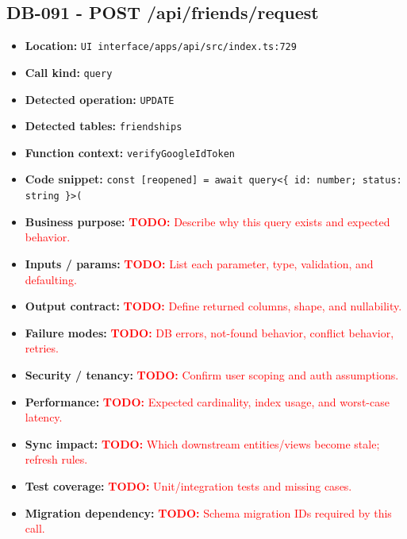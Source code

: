 \documentclass[11pt]{article}
\newcommand{\todoitem}[1]{\textcolor{red}{\textbf{TODO:} #1}}
\begin{document}
\subsection{DB-091 - POST /api/friends/request}
\begin{itemize}[leftmargin=1.5em]
\item \textbf{Location:} \texttt{UI interface/apps/api/src/index.ts:729}
\item \textbf{Call kind:} \texttt{query}
\item \textbf{Detected operation:} \texttt{UPDATE}
\item \textbf{Detected tables:} \texttt{friendships}
\item \textbf{Function context:} \texttt{verifyGoogleIdToken}
\item \textbf{Code snippet:} \texttt{const [reopened] = await query<\{ id: number; status: string \}>(}
\item \textbf{Business purpose:} \todoitem{Describe why this query exists and expected behavior.}
\item \textbf{Inputs / params:} \todoitem{List each parameter, type, validation, and defaulting.}
\item \textbf{Output contract:} \todoitem{Define returned columns, shape, and nullability.}
\item \textbf{Failure modes:} \todoitem{DB errors, not-found behavior, conflict behavior, retries.}
\item \textbf{Security / tenancy:} \todoitem{Confirm user scoping and auth assumptions.}
\item \textbf{Performance:} \todoitem{Expected cardinality, index usage, and worst-case latency.}
\item \textbf{Sync impact:} \todoitem{Which downstream entities/views become stale; refresh rules.}
\item \textbf{Test coverage:} \todoitem{Unit/integration tests and missing cases.}
\item \textbf{Migration dependency:} \todoitem{Schema migration IDs required by this call.}
\end{itemize}
\end{document}
